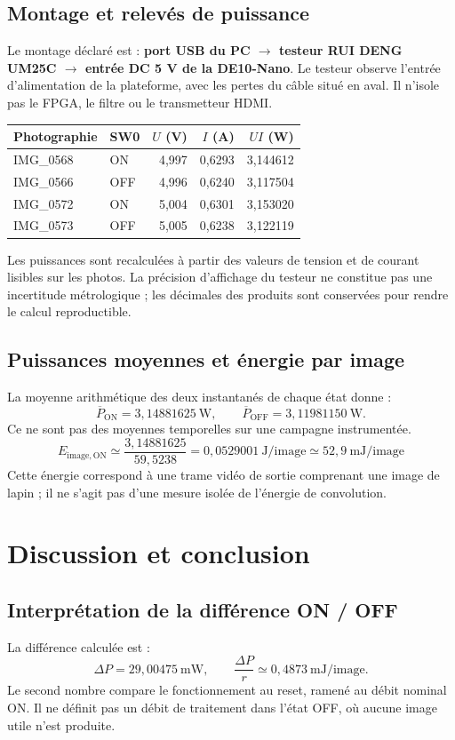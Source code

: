 \documentclass[11pt,a4paper]{article}
\begin{document}
\subsection{Montage et relevés de puissance}
Le montage déclaré est : \textbf{port USB du PC $\rightarrow$ testeur RUI DENG UM25C $\rightarrow$ entrée DC 5 V de la DE10-Nano}. Le testeur observe l'entrée d'alimentation de la plateforme, avec les pertes du câble situé en aval. Il n'isole pas le FPGA, le filtre ou le transmetteur HDMI.

\begin{center}
\begin{tabular}{@{}llrrr@{}}
\toprule
Photographie & SW0 & $U$ (V) & $I$ (A) & $UI$ (W)\\
\midrule
IMG\_0568 & ON & 4,997 & 0,6293 & 3,144612\\
IMG\_0566 & OFF & 4,996 & 0,6240 & 3,117504\\
IMG\_0572 & ON & 5,004 & 0,6301 & 3,153020\\
IMG\_0573 & OFF & 5,005 & 0,6238 & 3,122119\\
\bottomrule
\end{tabular}
\end{center}
Les puissances sont recalculées à partir des valeurs de tension et de courant lisibles sur les photos. La précision d'affichage du testeur ne constitue pas une incertitude métrologique ; les décimales des produits sont conservées pour rendre le calcul reproductible.

\subsection{Puissances moyennes et énergie par image}
La moyenne arithmétique des deux instantanés de chaque état donne :
\[
 \overline P_{\mathrm{ON}}=3{,}14881625\ \mathrm{W},\qquad
 \overline P_{\mathrm{OFF}}=3{,}11981150\ \mathrm{W}.
\]
Ce ne sont pas des moyennes temporelles sur une campagne instrumentée.
\[
 \boxed{E_{\mathrm{image,ON}}\simeq
 \frac{3{,}14881625}{59{,}5238}
 =0{,}0529001\ \mathrm{J/image}
 \simeq52{,}9\ \mathrm{mJ/image}}
\]
Cette énergie correspond à une trame vidéo de sortie comprenant une image de lapin ; il ne s'agit pas d'une mesure isolée de l'énergie de convolution.

\newpage
\section{Discussion et conclusion}
\subsection{Interprétation de la différence ON / OFF}
La différence calculée est :
\[
 \Delta P=29{,}00475\ \mathrm{mW},\qquad
 \frac{\Delta P}{r}\simeq0{,}4873\ \mathrm{mJ/image}.
\]
Le second nombre compare le fonctionnement au reset, ramené au débit nominal ON. Il ne définit pas un débit de traitement dans l'état OFF, où aucune image utile n'est produite.
\end{document}
